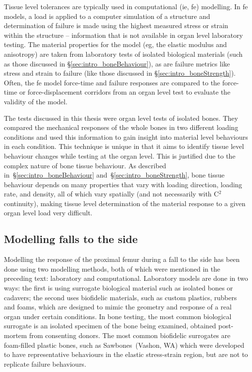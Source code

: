 Tissue level tolerances are typically used in computational (\ac{ie}, \acf{fe}) modelling.
In \ac{fe} models, a load is applied to a computer simulation of a structure and determination of failure is made using the highest measured stress or strain within the structure -- information that is not available in organ level laboratory testing.
The material properties for the model (\ac{eg}, the elastic modulus and anisotropy) are taken from laboratory tests of isolated biological materials (such as those discussed in \S\ref{sec:intro_boneBehaviour}), as are failure metrics like stress and strain to failure (like those discussed in \S\ref{sec:intro_boneStrength}).
Often, the \ac{fe} model force-time and failure responses are compared to the force-time or force-displacement corridors from an organ level test to evaluate the validity of the model.

The tests discussed in this thesis were organ level tests of isolated bones.
They compared the mechanical responses of the whole bones in two different loading conditions and used this information to gain insight into material level behaviours in each condition.
This technique is unique in that it aims to identify tissue level behaviour changes while testing at the organ level.
This is justified due to the complex nature of bone tissue behaviour.
As described in~\S\ref{sec:intro_boneBehaviour} and~\S\ref{sec:intro_boneStrength}, bone tissue behaviour depends on many properties that vary with loading direction, loading rate, and density, all of which vary spatially (and not necessarily with C$^2$ continuity), making tissue level determination of the material response to a given organ level load very difficult.

\subsection{Modelling falls to the side}
\label{sec:intro_understanding_modelling}
Modelling the response of the proximal femur during a fall to the side has been done using two modelling methods, both of which were mentioned in the preceding text: laboratory and computational.
Laboratory models are done in two ways: the first is using surrogate biological material such as isolated bones or cadavers; the second uses biofidelic materials, such as custom plastics, rubbers and foams, which are designed to mimic the geometry and response of a real organ under certain conditions.
In bone testing, the most common biological surrogate is an isolated specimen of the bone being examined, obtained post-mortem from consenting donors.
The most common biofidelic surrogates are foam-filled plastic bones, such as Sawbones\texttrademark~(Vashon, WA) which were developed to have representative behaviours in the elastic stress-strain region, but are not to replicate failure behaviours.

